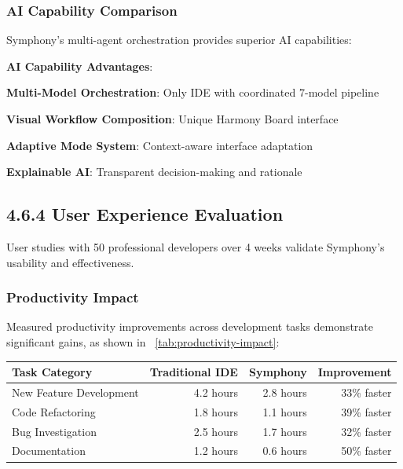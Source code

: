 \subsubsection*{AI Capability Comparison}

Symphony's multi-agent orchestration provides superior AI capabilities:

\begin{alertbox}
\textbf{AI Capability Advantages}:
\begin{compactlist}
    \item \textbf{Multi-Model Orchestration}: Only IDE with coordinated 7-model pipeline
    \item \textbf{Visual Workflow Composition}: Unique Harmony Board interface
    \item \textbf{Adaptive Mode System}: Context-aware interface adaptation
    \item \textbf{Explainable AI}: Transparent decision-making and rationale
\end{compactlist}
\end{alertbox}

\subsection*{4.6.4 User Experience Evaluation}
\label{subsec:ux-evaluation-results}

User studies with 50 professional developers over 4 weeks validate Symphony's usability and effectiveness.

\subsubsection*{Productivity Impact}

Measured productivity improvements across development tasks demonstrate significant gains, as shown in ~\ref{tab:productivity-impact}:

\begin{center}
\begin{tabular}{@{}lrrr@{}}
\toprule
\textbf{Task Category} & \textbf{Traditional IDE} & \textbf{Symphony} & \textbf{Improvement} \\
\midrule
New Feature Development & 4.2 hours & 2.8 hours & 33\% faster \\
Code Refactoring & 1.8 hours & 1.1 hours & 39\% faster \\
Bug Investigation & 2.5 hours & 1.7 hours & 32\% faster \\
Documentation & 1.2 hours & 0.6 hours & 50\% faster \\
\bottomrule
\end{tabular}
\label{tab:productivity-impact}
\end{center}

